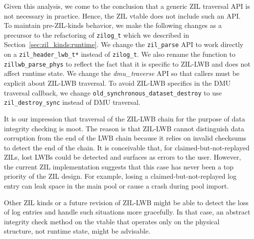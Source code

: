 \documentclass[12pt,a4paper,twoside]{book}
\begin{document}
Given this analysis, we come to the conclusion that a generic ZIL traversal API is not necessary in practice.
Hence, the ZIL vtable does not include such an API.
To maintain pre-ZIL-kinds behavior, we make the following changes as a precursor to the refactoring of \lstinline{zilog_t} which we described in Section~\ref{sec:zil_kinds:runtime}.
We change the \lstinline{zil_parse} API to work directly on a \lstinline{zil_header_lwb_t*} instead of \lstinline{zilog_t}.
We also rename the function to \lstinline{zillwb_parse_phys} to reflect the fact that it is specific to ZIL-LWB and does not affect runtime state.
We change the \textit{dmu\_traverse} API so that callers must be explicit about ZIL-LWB traversal.
To avoid ZIL-LWB specifics in the DMU traversal callback, we change \lstinline{old_synchronous_dataset_destroy} to use \lstinline{zil_destroy_sync} instead of DMU traversal.

It is our impression that traversal of the ZIL-LWB chain for the purpose of data integrity checking is moot.
The reason is that ZIL-LWB cannot distinguish data corruption from the end of the LWB chain because it relies on invalid checksums to detect the end of the chain.
It is conceivable that, for claimed-but-not-replayed ZILs, lost LWBs could be detected and surfaces as errors to the user.
However, the current ZIL implementation suggests that this case has never been a top priority of the ZIL design.
For example, losing a claimed-but-not-replayed log entry can leak space in the main pool or cause a crash during pool import.

Other ZIL kinds or a future revision of ZIL-LWB might be able to detect the loss of log entries and handle such situations more gracefully.
In that case, an abstract integrity check method on the vtable that operates only on the physical structure, not runtime state, might be advisable.
\end{document}
